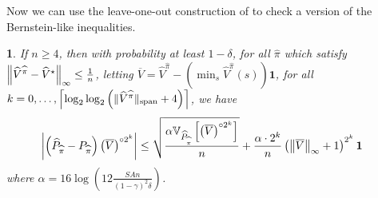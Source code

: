\documentclass{article}
\theoremstyle{plain}
\theoremstyle{plain}
\newtheorem{lem}[thm]{\protect\lemmaname}
\theoremstyle{remark}
\theoremstyle{plain}
\theoremstyle{plain}
\providecommand{\lemmaname}{Lemma}
\newcommand{\Var}{\mathbb{V}}
\newcommand{\Phat}{\widehat{P}}
\newcommand{\Vhat}{\widehat{V}}
\newcommand{\one}{\mathbf{1}}
\newcommand{\pihat}{\widehat{\pi}}
\newcommand{\Vhatstar}{\widehat{V}^\star}
\newcommand{\Vc}{\overline{V}}
\begin{document}
Now we can use the leave-one-out construction of \cite{agarwal_model-based_2020} to check a version of the Bernstein-like inequalities.
\begin{lem}
\label{lem:LOO_DMDP_bernstein_bound}
    If $n \geq 4$, then with probability at least $1-\delta$, for all $\pihat$ which satisfy $\infnorm{\Vhat^{\pihat} - \Vhatstar} \leq \frac{1}{n}$, letting $\Vc = \Vhat^{\pihat} - \left(\min_s \Vhat^{\pihat}(s)\right)\one$, for all $k = 0, \dots, \left\lceil\log_2 \log_2 \left( \spannorm{\Vhat^{\pihat}} + 4\right) \right\rceil$, we have
    \begin{align*}
        \left| \left(\Phat_{\pihat} - P_{\pihat}\right) \left( \Vc \right)^{\circ 2^k} \right|
    &\leq \sqrt{\frac{\alpha   \Var_{\Phat_{\pihat}} \left[ \left(\Vc \right)^{\circ 2^k}  \right]    }{n }} + \frac{ \alpha \cdot 2^k }{n}  \left( \infnorm{\Vc} + 1\right)^{2^k}   \one
    \end{align*}
where $\alpha = 16 \log \left(12 \frac{SAn}{(1-\gamma)^2 \delta} \right)$.
\end{lem}
\end{document}
